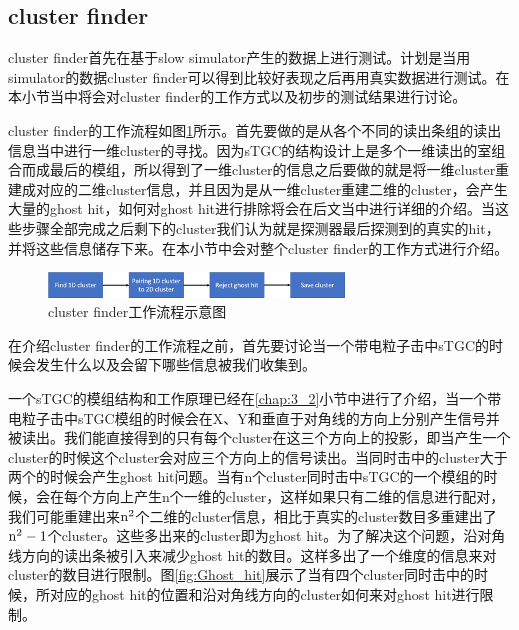 \subsection{cluster finder}

cluster finder首先在基于slow simulator产生的数据上进行测试。计划是当用simulator的数据cluster finder可以得到比较好表现之后再用真实数据进行测试。在本小节当中将会对cluster finder的工作方式以及初步的测试结果进行讨论。

cluster finder的工作流程如图\ref{fig:Cluster_Finder_work_flow}所示。首先要做的是从各个不同的读出条组的读出信息当中进行一维cluster的寻找。因为sTGC的结构设计上是多个一维读出的室组合而成最后的模组，所以得到了一维cluster的信息之后要做的就是将一维cluster重建成对应的二维cluster信息，并且因为是从一维cluster重建二维的cluster，会产生大量的ghost hit，如何对ghost hit进行排除将会在后文当中进行详细的介绍。当这些步骤全部完成之后剩下的cluster我们认为就是探测器最后探测到的真实的hit，并将这些信息储存下来。在本小节中会对整个cluster finder的工作方式进行介绍。

\begin{figure}[htb]
    \begin{center}
    \includegraphics[width=0.7\textwidth,clip]{figures/Chapter3/Cluster_Finder_work_flow.png}
    \end{center}
    \caption[cluster finder工作流程示意图]{cluster finder工作流程示意图}
    \label{fig:Cluster_Finder_work_flow}
\end{figure}

在介绍cluster finder的工作流程之前，首先要讨论当一个带电粒子击中sTGC的时候会发生什么以及会留下哪些信息被我们收集到。

一个sTGC的模组结构和工作原理已经在\ref{chap:3_2}小节中进行了介绍，当一个带电粒子击中sTGC模组的时候会在X、Y和垂直于对角线的方向上分别产生信号并被读出。我们能直接得到的只有每个cluster在这三个方向上的投影，即当产生一个cluster的时候这个cluster会对应三个方向上的信号读出。当同时击中的cluster大于两个的时候会产生ghost hit问题。当有n个cluster同时击中sTGC的一个模组的时候，会在每个方向上产生n个一维的cluster，这样如果只有二维的信息进行配对，我们可能重建出来${\rm n^2}$个二维的cluster信息，相比于真实的cluster数目多重建出了${\rm n^2}-1$个cluster。这些多出来的cluster即为ghost hit。为了解决这个问题，沿对角线方向的读出条被引入来减少ghost hit的数目。这样多出了一个维度的信息来对cluster的数目进行限制。图\ref{fig:Ghost_hit}展示了当有四个cluster同时击中的时候，所对应的ghost hit的位置和沿对角线方向的cluster如何来对ghost hit进行限制。

